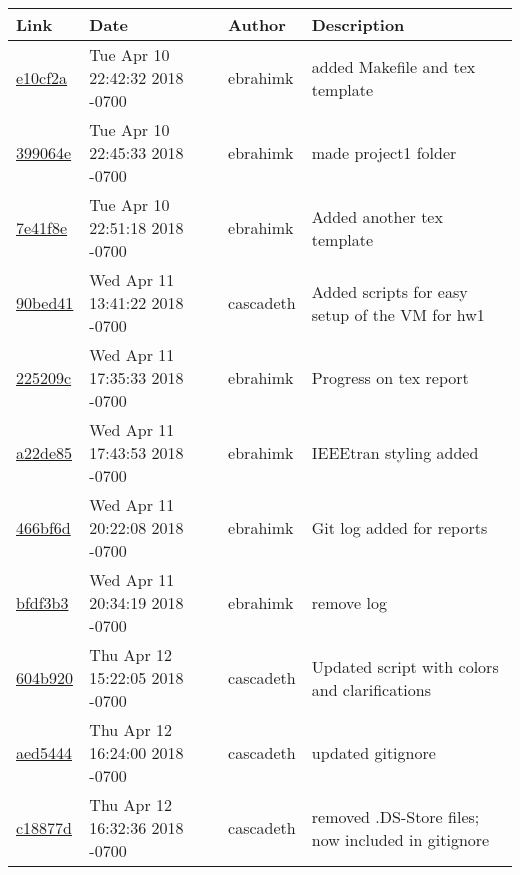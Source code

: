 \begin{tabular}{l l l l}\textbf{Link} & \textbf{Date} & \textbf{Author} & \textbf{Description}\\\hline
\href{https://github.com/ebrahimk/CS444/commit/e10cf2a5be3cb7528d156eb991bb4ee94c5ac0f3}{e10cf2a} & Tue Apr 10 22:42:32 2018 -0700 & ebrahimk & added Makefile and tex template\\\hline
\href{https://github.com/ebrahimk/CS444/commit/399064e4a3c386c1aed3ebf025f2e964411049fb}{399064e} & Tue Apr 10 22:45:33 2018 -0700 & ebrahimk & made project1 folder\\\hline
\href{https://github.com/ebrahimk/CS444/commit/7e41f8e334d9b67756aa7fb715773a4360e83a3b}{7e41f8e} & Tue Apr 10 22:51:18 2018 -0700 & ebrahimk & Added another tex template\\\hline
\href{https://github.com/ebrahimk/CS444/commit/90bed413ed27774ee7f3d84703ea90d9f32e4484}{90bed41} & Wed Apr 11 13:41:22 2018 -0700 & cascadeth & Added scripts for easy setup of the VM for hw1\\\hline
\href{https://github.com/ebrahimk/CS444/commit/225209cf1bb27caaab8d148d66ad2cebcc347828}{225209c} & Wed Apr 11 17:35:33 2018 -0700 & ebrahimk & Progress on tex report\\\hline
\href{https://github.com/ebrahimk/CS444/commit/a22de85663bb053c8335c5e3592ea39b65c292a0}{a22de85} & Wed Apr 11 17:43:53 2018 -0700 & ebrahimk & IEEEtran styling added\\\hline
\href{https://github.com/ebrahimk/CS444/commit/466bf6d68d7bb5055f687bad89014f47d1a98575}{466bf6d} & Wed Apr 11 20:22:08 2018 -0700 & ebrahimk & Git log added for reports\\\hline
\href{https://github.com/ebrahimk/CS444/commit/bfdf3b3f6ce5e223fe99ec5bf17eb73c64853601}{bfdf3b3} & Wed Apr 11 20:34:19 2018 -0700 & ebrahimk & remove log\\\hline
\href{https://github.com/ebrahimk/CS444/commit/604b920fe6c569ed6a59f81d457f5c07590b2661}{604b920} & Thu Apr 12 15:22:05 2018 -0700 & cascadeth & Updated script with colors and clarifications\\\hline
\href{https://github.com/ebrahimk/CS444/commit/aed5444563d69dd80a0e0dc05e9659e82afc980a}{aed5444} & Thu Apr 12 16:24:00 2018 -0700 & cascadeth & updated gitignore\\\hline
\href{https://github.com/ebrahimk/CS444/commit/c18877d67d024ff8a33b14138f21d754cd89d805}{c18877d} & Thu Apr 12 16:32:36 2018 -0700 & cascadeth & removed .DS-Store files; now included in gitignore\\\hline\end{tabular}
